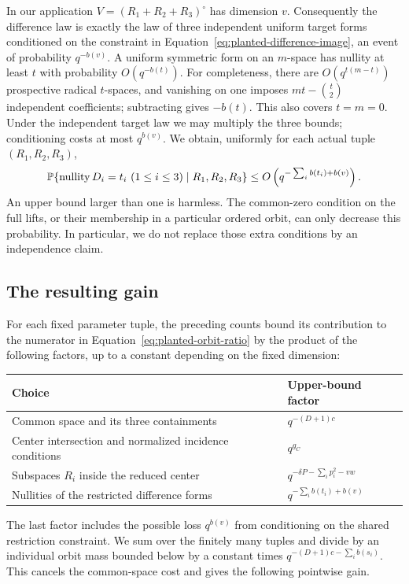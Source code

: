 In our application $V=(R_1+R_2+R_3)^\circ$ has dimension $v$.
Consequently the difference law is exactly the law of three independent
uniform target forms conditioned on the constraint in
Equation~\eqref{eq:planted-difference-image}, an event of probability
$q^{-b(v)}$.  A uniform symmetric form on an $m$-space has nullity
at least $t$ with probability $O(q^{-b(t)})$.  For completeness,
there are $O(q^{t(m-t)})$ prospective radical $t$-spaces, and
vanishing on one imposes $mt-\binom t2$ independent coefficients;
subtracting gives $-b(t)$.  This also covers $t=m=0$.
Under the independent target law we may multiply the three bounds;
conditioning costs at most $q^{b(v)}$.  We obtain, uniformly for
each actual tuple $(R_1,R_2,R_3)$,
\begin{equation}\label{eq:planted-nullity-cost}
 \P\{\operatorname{nullity}D_i=t_i\ (1\le i\le3)\mid R_1,R_2,R_3\}
   \le O\left(q^{-\sum_i b(t_i)+b(v)}\right).
\end{equation}
An upper bound larger than one is harmless.  The common-zero
condition on the full lifts, or their membership in a particular
ordered orbit, can only decrease this probability.  In particular,
we do not replace those extra conditions by an independence claim.

\subsection{The resulting gain}

For each fixed parameter tuple, the preceding counts bound its
contribution to the numerator in Equation~\eqref{eq:planted-orbit-ratio}
by the product of the following factors, up to a constant depending
on the fixed dimension:
\begin{center}
\begin{tabular}{@{}ll@{}}
\toprule
Choice & Upper-bound factor\\
\midrule
Common space and its three containments
  & \(q^{-(D+1)c}\)\\
Center intersection and normalized incidence conditions
  & \(q^{g_C}\)\\
Subspaces \(R_i\) inside the reduced center
  & \(q^{-\delta P-\sum_i p_i^2-vw}\)\\
Nullities of the restricted difference forms
  & \(q^{-\sum_i b(t_i)+b(v)}\)\\
\bottomrule
\end{tabular}
\end{center}
The last factor includes the possible loss \(q^{b(v)}\) from
conditioning on the shared restriction constraint. We sum over the
finitely many tuples and divide by an individual orbit mass bounded
below by a constant times \(q^{-(D+1)c-\sum_i b(s_i)}\). This cancels
the common-space cost and gives the following pointwise gain.

